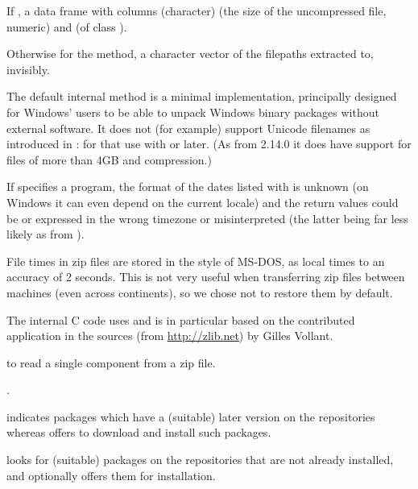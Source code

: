 %
\begin{Value}
If , a data frame with columns 
(character)  (the size of the uncompressed file, numeric)
and  (of class ).

Otherwise for the  method, a character vector of the
filepaths extracted to, invisibly.
\end{Value}
%
\begin{Note}\relax
The default internal method is a minimal implementation, principally
designed for Windows' users to be able to unpack Windows binary
packages without external software.  It does not (for example) support
Unicode filenames as introduced in : for that use
 with  or later.  (As from
\R{} 2.14.0 it does have support for files of more than 4GB and
 compression.)

If  specifies a program, the format of the dates listed
with  is unknown (on Windows it can even depend on
the current locale) and the return values could be  or
expressed in the wrong timezone or misinterpreted (the latter being
far less likely as from ).

File times in zip files are stored in the style of MS-DOS, as local times
to an accuracy of 2 seconds.  This is not very useful when
transferring zip files between machines (even across continents), so
we chose not to restore them by default.
\end{Note}
%
\begin{Source}\relax
The internal C code uses  and is in particular based on the
contributed  application in the  sources
(from \url{http://zlib.net}) by Gilles Vollant.
\end{Source}
%
\begin{SeeAlso}\relax
{} to read a single component from a zip file.

.
\end{SeeAlso}
%
\begin{Description}\relax
{} indicates packages which have a (suitable) later
version on the repositories whereas  offers to
download and install such packages.

 looks for (suitable) packages on the repositories
that are not already installed, and optionally offers them for
installation.
\end{Description}
